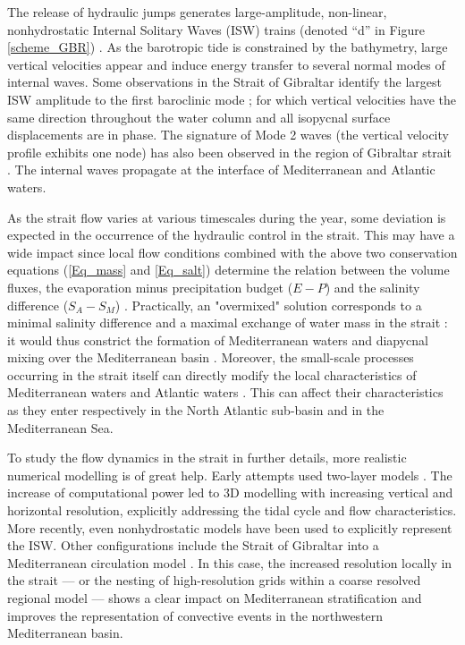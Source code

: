 The release of hydraulic jumps generates large-amplitude, non-linear, nonhydrostatic Internal Solitary Waves (ISW) trains (denoted ``d'' in Figure \ref{scheme_GBR}) \citep{FA1988}. As the barotropic tide is constrained by the bathymetry, large vertical velocities appear and induce energy transfer to several normal modes of internal waves. Some observations in the Strait of Gibraltar identify the largest ISW amplitude to the first baroclinic mode ; for which vertical velocities have the same direction throughout the water column and all isopycnal surface displacements are in phase. The signature of Mode 2 waves (the vertical velocity profile exhibits one node) has also been observed in the region of Gibraltar strait \citep{FA1988,Vazquez2006}. The internal waves propagate at the interface of Mediterranean and Atlantic waters. 

As the strait flow varies at various timescales during the year, some deviation is expected in the occurrence of the hydraulic control in the strait. This may have a wide impact since local flow conditions combined with the above two conservation equations (\ref{Eq_mass} and \ref{Eq_salt}) determine the relation between the volume fluxes, the evaporation minus precipitation budget ($E-P$) and the salinity difference ($S_A-S_M$) \citep{BK91}. Practically, an "overmixed" solution corresponds to a minimal salinity difference and a maximal exchange of water mass in the strait : it would thus constrict the formation of Mediterranean waters and diapycnal mixing over the Mediterranean basin \citep{BS84,Garett90}. Moreover, the small-scale processes occurring in the strait itself can directly modify the local characteristics of Mediterranean waters \citep{GarciaLafuente2011, Naranjo2015} and Atlantic waters \citep{Millot2014}. This can affect their characteristics as they enter respectively in the North Atlantic sub-basin and in the Mediterranean Sea. 

To study the flow dynamics in the strait in further details, more realistic numerical modelling is of great help. Early attempts used two-layer models  \citep{brandt_1996, Izquierdo2001}. The increase of computational power led to 3D modelling \citep{Sannino2004} with increasing vertical and horizontal resolution, explicitly addressing the tidal cycle and flow characteristics. More recently, even nonhydrostatic models have been used \citep{SG2011, Sannino2014} to explicitly represent the ISW. Other configurations include the Strait of Gibraltar into a Mediterranean circulation model \citep{SN2015}. In this case, the increased resolution locally in the strait \citep{Naranjo2014} --- or the nesting of high-resolution grids within a coarse resolved regional model \citep{Sannino2009} --- shows a clear impact on Mediterranean stratification and improves the representation of convective events in the northwestern Mediterranean basin.

